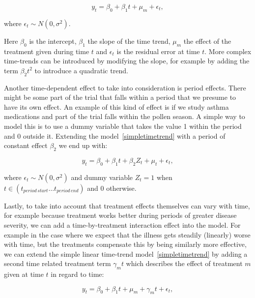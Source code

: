 \documentclass[12pt,a4paper,leqno]{report}
\theoremstyle{plain}
\theoremstyle{definition}
\theoremstyle{remark}
\begin{document}
\begin{def}\label{}
    \begin{equation}\label{simpletimetrend}
        y_t = \beta_0 + \beta_1 t + \mu_m + \epsilon_t,
    \end{equation}
\end{def}where \(\epsilon_t \sim N(0,\sigma^2)\).

Here \(\beta_0\) is the intercept, \(\beta_1\) the slope of the time trend,
\(\mu_m\) the effect of the treatment given during time \(t\) and \(\epsilon_t\)
is the residual error at time \(t\). More complex time-trends can be introduced
by modifying the slope, for example by adding the term \(\beta_2 t^2\) to
introduce a quadratic trend.

Another time-dependent effect to take into consideration is period effects.
There might be some part of the trial that falls within a period that we presume
to have its own effect. An example of this kind of effect is if we study asthma
medications and part of the trial falls within the pollen season. A simple way
to model this is to use a dummy variable that takes the value 1 within the
period and 0 outside it. Extending the model\ \ref{simpletimetrend} with a period of constant
effect \(\beta_2\) we end up with:

\begin{def}\label{}
    \begin{equation}\label{}
        y_t = \beta_0 + \beta_1 t + \beta_{2}Z_t + \mu_t + \epsilon_t,
    \end{equation}
\end{def}where \(\epsilon_t \sim N(0,\sigma^2)\) and dummy variable \(Z_t = 1\)
when \(t \in (t_{period\,start} \ldots t_{period\,end}) \) and \(0\) otherwise.

Lastly, to take into account that treatment effects themselves can vary with
time, for example because treatment works better during periods of greater
disease severity, we can add a time-by-treatment interaction effect into the
model. For example in the case where we expect that the illness gets steadily
(linearly) worse with time, but the treatments compensate this by being
similarly more effective, we can extend the simple linear
time-trend model\ \ref{simpletimetrend} by adding a second time related
treatment term \(\gamma_m t\) which describes the effect of treatment \(m \) given at
time \(t \) in regard to time:

\begin{def}\label{}
    \begin{equation}\label{}
        y_t = \beta_0 + \beta_1 t + \mu_m + \gamma_m t + \epsilon_t,
    \end{equation}
\end{def}
\end{document}
